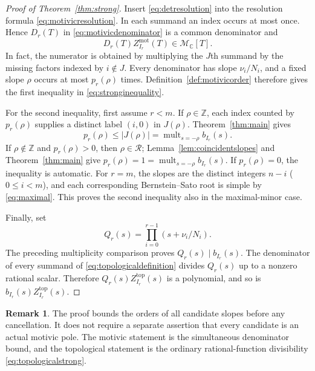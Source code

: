 \documentclass[11pt,a4paper]{article}
\numberwithin{equation}{section}
\theoremstyle{definition}
\newtheorem{remark}[theorem]{Remark}
\newcommand{\C}{\mathbb C}
\newcommand{\Z}{\mathbb Z}
\DeclareMathOperator{\mult}{mult}
\begin{document}
\begin{proof}[Proof of Theorem~\ref{thm:strong}]
Insert \eqref{eq:detresolution} into the resolution formula
\eqref{eq:motivicresolution}. In each summand an index occurs at
most once. Hence $D_r(T)$ in \eqref{eq:motivicdenominator} is a
common denominator and
\[
D_r(T)Z_{I_r}^{\mathrm{mot}}(T)\in\mathcal M_{\C}[T].
\]
In fact, the numerator is obtained by multiplying the $J$th
summand by the missing factors indexed by $i\notin J$.
Every denominator has slope $\nu_i/N_i$, and a fixed slope $\rho$
occurs at most $p_r(\rho)$ times. Definition~\ref{def:motivicorder}
therefore gives the first inequality in \eqref{eq:stronginequality}.

For the second inequality, first assume $r<m$. If $\rho\in\Z$,
each index counted by $p_r(\rho)$ supplies a distinct label $(i,0)$
in $J(\rho)$. Theorem~\ref{thm:main} gives
\[
p_r(\rho)\le |J(\rho)|=\mult_{s=-\rho}b_{I_r}(s).
\]
If $\rho\notin\Z$ and $p_r(\rho)>0$, then $\rho\in\mathcal R$;
Lemma~\ref{lem:coincidentslopes} and Theorem~\ref{thm:main} give
$p_r(\rho)=1=\mult_{s=-\rho}b_{I_r}(s)$. If $p_r(\rho)=0$,
the inequality is automatic.
For $r=m$, the slopes are the distinct integers $n-i$
($0\le i<m$), and each corresponding Bernstein--Sato root is
simple by \eqref{eq:maximal}. This proves the second inequality
also in the maximal-minor case.

Finally, set
\[
Q_r(s)=\prod_{i=0}^{r-1}(s+\nu_i/N_i).
\]
The preceding multiplicity comparison proves $Q_r(s)\mid b_{I_r}(s)$.
The denominator of every summand of
\eqref{eq:topologicaldefinition} divides $Q_r(s)$ up to a nonzero
rational scalar. Therefore $Q_r(s)Z_{I_r}^{\mathrm{top}}(s)$ is a
polynomial, and so is $b_{I_r}(s)Z_{I_r}^{\mathrm{top}}(s)$.
\end{proof}

\begin{remark}
The proof bounds the orders of all candidate slopes before any
cancellation. It does not require a separate assertion that every
candidate is an actual motivic pole. The motivic statement is the
simultaneous denominator bound, and the topological statement is the
ordinary rational-function divisibility
\eqref{eq:topologicalstrong}.
\end{remark}
\end{document}
